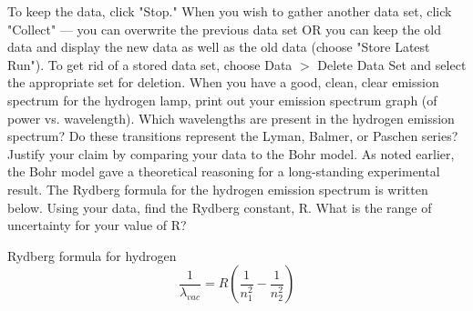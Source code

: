 To keep the data, click "Stop." 
When you wish to gather another data set, click "Collect" — you can overwrite the previous data set OR you can keep the old data and display the new data as well as the old data (choose "Store Latest Run"). 
To get rid of a stored data set, choose Data $>$ Delete Data Set and select the appropriate set for deletion. 
When you have a good, clean, clear emission spectrum for the hydrogen lamp, print out your emission spectrum graph (of power vs. wavelength).
Which wavelengths are present in the hydrogen emission spectrum? 
Do these transitions represent the Lyman, Balmer, or Paschen series? 
Justify your claim by comparing your data to the Bohr model. 
As noted earlier, the Bohr model gave a theoretical reasoning for a long-standing experimental result. 
The Rydberg formula for the hydrogen emission spectrum is written below. 
Using your data, find the Rydberg constant, R. 
What is the range of uncertainty for your value of R?
\par
Rydberg formula for hydrogen
\[ \frac{1}{\lambda_{vac}} = R \left( \frac{1}{n_{1}^{2}} - \frac{1}{n_{2}^{2}} \right) \]

